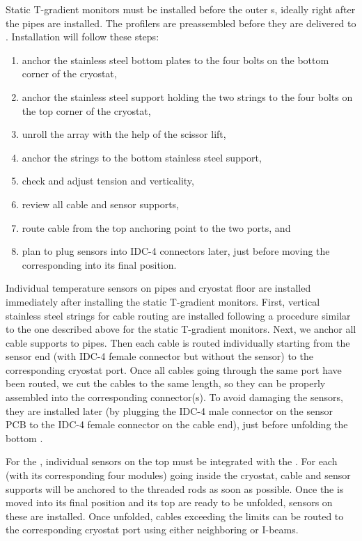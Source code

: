 Static T-gradient monitors %
must be installed before the outer s, ideally %
right after the pipes are installed. The profilers %
are preassembled before they are delivered to \surf. 
Installation will follow these steps:
\begin{enumerate}
\item anchor the stainless steel bottom plates to the four bolts on the bottom corner of the cryostat,
\item anchor the stainless steel support holding the two strings to the four bolts on the top corner of the cryostat,
\item unroll the array with the help of the scissor lift,
\item anchor the strings to the bottom stainless steel support,   
\item check and adjust tension and verticality,
\item review all cable and sensor supports, 
\item route cable from the top anchoring point to the two  ports, and 
\item plan to plug sensors into IDC-4 connectors later, just before moving the corresponding  into its final position. 
\end{enumerate}

Individual temperature sensors on pipes and cryostat floor %
are installed immediately after installing the static T-gradient monitors. First, vertical stainless steel strings for cable routing %
are installed following a procedure similar to the one described above for the static T-gradient monitors. Next, we anchor all cable supports to pipes. Then each cable %
is routed individually starting from the sensor end (with IDC-4 female connector but without the sensor)
to the corresponding cryostat port. Once all cables going through the same port have been routed, we cut the cables to the same length, so they can be properly assembled into the corresponding connector(s). To avoid damaging the sensors, they are installed later (by plugging the IDC-4 male connector on the sensor PCB to the IDC-4 female connector on the cable end), just before unfolding the bottom .

For the , individual sensors on the top  must be integrated with the . For each  (with its corresponding four   modules)
going inside the cryostat, cable and sensor supports will be anchored to the   threaded rods as soon as possible.
Once the  is moved into its final position and its top  are ready to be unfolded, sensors on these  %
are installed. Once unfolded, cables 
exceeding the  limits can be routed to the corresponding cryostat port using either neighboring  or  I-beams. 



